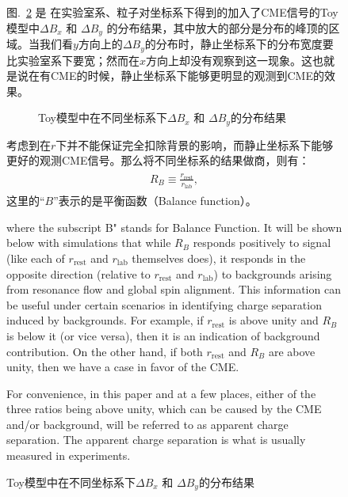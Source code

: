 \begin{figure}[htbp]
 图.~\ref{fig:BFHisto_rest_lab_example} 是 在实验室系、粒子对坐标系下得到的加入了CME信号的Toy模型中$\Delta B_x$ 和 $\Delta B_y$ 的分布结果，其中放大的部分是分布的峰顶的区域。当我们看$y$方向上的$\Delta B_y$的分布时，静止坐标系下的分布宽度要比实验室系下要宽；然而在$x$方向上却没有观察到这一现象。这也就是说在有CME的时候，静止坐标系下能够更明显的观测到CME的效果。
\begin{figure}[htbp]
\centering
{}
\caption{Toy模型中在不同坐标系下$\Delta B_x$ 和 $\Delta B_y$的分布结果~\cite{Tang2019}}
\label{fig:BFHisto_rest_lab_example}
\end{figure}

考虑到在$r$下并不能保证完全扣除背景的影响，而静止坐标系下能够更好的观测CME信号。那么将不同坐标系的结果做商，则有：
\begin{eqnarray}
\begin{aligned}
R_{B} \equiv  \frac{r_{\mathrm{rest}}}{r_{\mathrm{lab}}},
\end{aligned}
\label{eq:R_B}
\end{eqnarray}
这里的“$B$”表示的是平衡函数（Balance function）。

where the subscript B" stands for Balance Function.
It will be shown below with simulations that while $R_{B}$
responds positively to signal (like each of $r_{\mathrm{rest}}$ and $r_{\mathrm{lab}}$ themselves does), it responds in the opposite direction (relative to $r_{\mathrm{rest}}$  and $r_{\mathrm{lab}}$) to backgrounds arising from resonance flow and global spin alignment. This information can be useful under certain scenarios in identifying charge separation induced by backgrounds. For example, if $r_{\mathrm{rest}}$ is above unity and $R_{B}$ is below it (or vice versa), then it is an indication of background contribution. On the other hand, if both $r_{\mathrm{rest}}$ and $R_{B}$ are above unity, then we have a case in favor of the CME.
 
For convenience, in this paper and at a few places, either of the three ratios being above unity, which can be caused by the CME and/or background, will be referred to as apparent charge separation. The apparent charge separation is what is usually measured in experiments.









\end{figure}
